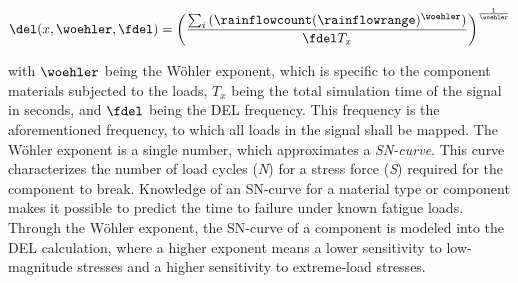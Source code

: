 \begin{equation}
  \del(x, \woehler, \fdel) = \left( \frac{\sum_i{(\rainflowcount (\rainflowrange)^\woehler})}{\fdel T_x} \right)^{\frac{1}{\woehler}}
  \label{eq:del}
\end{equation}

with $\woehler$ being the Wöhler exponent, which is specific to the component materials subjected to the loads, $T_x$ being the total simulation time of the signal in seconds, and $\fdel $ being the DEL frequency. This frequency is the aforementioned frequency, to which all loads in the signal shall be mapped. The Wöhler exponent is a single number, which approximates a \textit{SN-curve}. This curve characterizes the number of load cycles (\textit{N}) for a stress force (\textit{S}) required for the component to break. Knowledge of an SN-curve for a material type or component makes it possible to predict the time to failure under known fatigue loads. Through the Wöhler exponent, the SN-curve of a component is modeled into the DEL calculation, where a higher exponent means a lower sensitivity to low-magnitude stresses and a higher sensitivity to extreme-load stresses. \cite{blasquesMeanLoadEffects2013} \cite{freeburyDeterminingEquivalentDamage2000}

